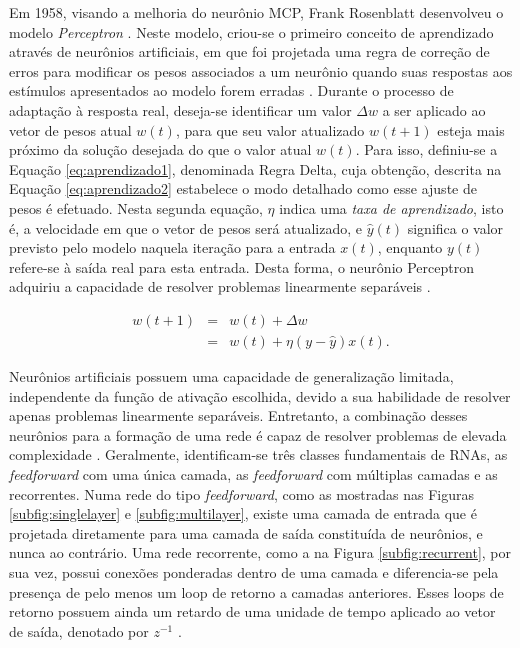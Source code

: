 Em 1958, visando a melhoria do neurônio MCP, Frank Rosenblatt desenvolveu o modelo \emph{Perceptron} \cite{Rosenblatt}. Neste modelo, criou-se o primeiro conceito de aprendizado através de neurônios artificiais, em que foi projetada uma regra de correção de erros para modificar os pesos associados a um neurônio quando suas respostas aos estímulos apresentados ao modelo forem erradas \cite{arbib}. Durante o processo de adaptação à resposta real, deseja-se identificar um valor $\Delta w$ a ser aplicado ao vetor de pesos atual $w(t)$, para que seu valor atualizado $w(t+1)$ esteja mais próximo da solução desejada do que o valor atual $w(t)$. Para isso, definiu-se a Equação \ref{eq:aprendizado1}, denominada Regra Delta, cuja obtenção, descrita na Equação \ref{eq:aprendizado2} estabelece o modo detalhado como esse ajuste de pesos é efetuado. Nesta segunda equação, $\eta$ indica uma \emph{taxa de aprendizado}, isto é, a velocidade em que o vetor de pesos será atualizado, e $\hat{y}(t)$ significa o valor previsto pelo modelo naquela iteração para a entrada $x(t)$, enquanto $y(t)$ refere-se à saída real para esta entrada. Desta forma, o neurônio Perceptron adquiriu a capacidade de resolver problemas linearmente separáveis \cite{braga}.

\begin{eqnarray}
  w(t+1) &=& w(t) + \Delta w   \label{eq:aprendizado1}\\
  &=& w(t) + \eta (y - \hat{y}) x(t) \label{eq:aprendizado2}.
\end{eqnarray}

Neurônios artificiais possuem uma capacidade de generalização limitada, independente da função de ativação escolhida, devido a sua habilidade de resolver apenas problemas linearmente separáveis. Entretanto, a combinação desses neurônios para a formação de uma rede é capaz de resolver problemas de elevada complexidade \cite{braga}. Geralmente, identificam-se três classes fundamentais de RNAs, as \emph{feedforward} com uma única camada, as \emph{feedforward} com múltiplas camadas e as recorrentes. Numa rede do tipo \emph{feedforward}, como as mostradas nas Figuras \ref{subfig:singlelayer} e \ref{subfig:multilayer}, existe uma camada de entrada que é projetada diretamente para uma camada de saída constituída de neurônios, e nunca ao contrário. Uma rede recorrente, como a na Figura \ref{subfig:recurrent}, por sua vez, possui conexões ponderadas dentro de uma camada e diferencia-se pela presença de pelo menos um loop de retorno a camadas anteriores. Esses loops de retorno possuem ainda um retardo de uma unidade de tempo aplicado ao vetor de saída, denotado por $z^{-1}$ \cite{haykin}.

